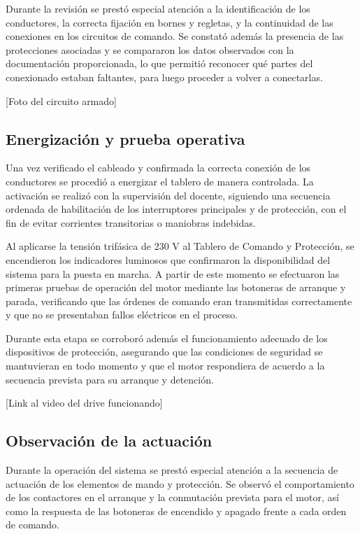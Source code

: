 Durante la revisión se prestó especial atención a la identificación de los conductores, la correcta fijación en bornes y regletas, y la continuidad de las conexiones en los circuitos de comando. Se constató además la presencia de las protecciones asociadas y se compararon los datos observados con la documentación proporcionada, lo que permitió reconocer qué partes del conexionado estaban faltantes, para luego proceder a volver a conectarlas.

[Foto del circuito armado]

\subsection{Energización y prueba operativa}

Una vez verificado el cableado y confirmada la correcta conexión de los conductores se procedió a energizar el tablero de manera controlada. La activación se realizó con la supervisión del docente, siguiendo una secuencia ordenada de habilitación de los interruptores principales y de protección, con el fin de evitar corrientes transitorias o maniobras indebidas.  

Al aplicarse la tensión trifásica de 230 V al Tablero de Comando y Protección, se encendieron los indicadores luminosos que confirmaron la disponibilidad del sistema para la puesta en marcha. A partir de este momento se efectuaron las primeras pruebas de operación del motor mediante las botoneras de arranque y parada, verificando que las órdenes de comando eran transmitidas correctamente y que no se presentaban fallos eléctricos en el proceso.  

Durante esta etapa se corroboró además el funcionamiento adecuado de los dispositivos de protección, asegurando que las condiciones de seguridad se mantuvieran en todo momento y que el motor respondiera de acuerdo a la secuencia prevista para su arranque y detención.

[Link al video del drive funcionando]

\subsection{Observación de la actuación}

Durante la operación del sistema se prestó especial atención a la secuencia de actuación de los elementos de mando y protección. Se observó el comportamiento de los contactores en el arranque y la conmutación prevista para el motor, así como la respuesta de las botoneras de encendido y apagado frente a cada orden de comando.  

